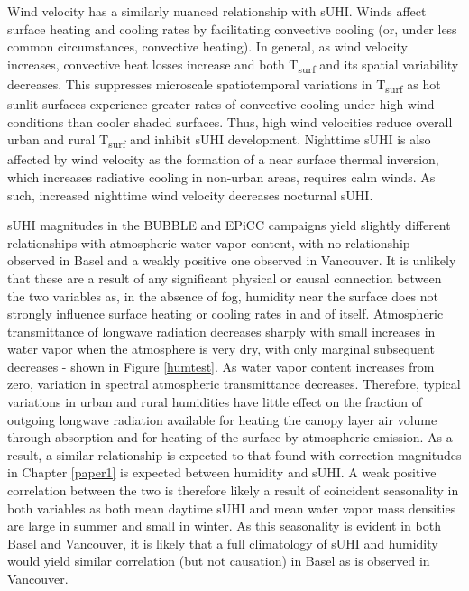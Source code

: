 \begin{bibunit}
Wind velocity has a similarly nuanced relationship with sUHI. Winds affect surface heating and cooling rates by facilitating convective cooling (or, under less common circumstances, convective heating). In general, as wind velocity increases, convective heat losses increase and both T\textsubscript{surf} and its spatial variability decreases. This suppresses microscale spatiotemporal variations in T\textsubscript{surf} as hot sunlit surfaces experience greater rates of convective cooling under high wind conditions than cooler shaded surfaces. Thus, high wind velocities reduce overall urban and rural T\textsubscript{surf} and inhibit sUHI development. Nighttime sUHI is also affected by wind velocity as the formation of a near surface thermal inversion, which increases radiative cooling in non-urban areas, requires calm winds. As such, increased nighttime wind velocity decreases nocturnal sUHI.

sUHI magnitudes in the BUBBLE and EPiCC campaigns yield slightly different relationships with atmospheric water vapor content, with no relationship observed in Basel and a weakly positive one observed in Vancouver. It is unlikely that these are a result of any significant physical or causal connection between the two variables as, in the absence of fog, humidity near the surface does not strongly influence surface heating or cooling rates in and of itself. Atmospheric transmittance of longwave radiation decreases sharply with small increases in water vapor when the atmosphere is very dry, with only marginal subsequent decreases - shown in Figure \ref{humtest}. As water vapor content increases from zero, variation in spectral atmospheric transmittance decreases. Therefore, typical variations in urban and rural humidities have little effect on the fraction of outgoing longwave radiation available for heating the canopy layer air volume through absorption and for heating of the surface by atmospheric emission. As a result, a similar relationship is expected to that found with correction magnitudes in Chapter \ref{paper1} is expected between humidity and sUHI. A weak positive correlation between the two is therefore likely a result of coincident seasonality in both variables as both mean daytime sUHI and mean water vapor mass densities are large in summer and small in winter. As this seasonality is evident in both Basel and Vancouver, it is likely that a full climatology of sUHI and humidity would yield similar correlation (but not causation) in Basel as is observed in Vancouver. 


\end{bibunit}
